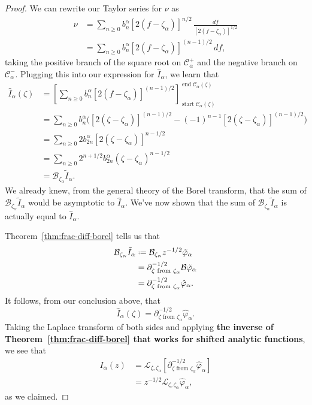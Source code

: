 \documentclass{article}
\newcommand*{\defeq}{\mathrel{\vcenter{\baselineskip0.5ex \lineskiplimit0pt
                     \hbox{\scriptsize.}\hbox{\scriptsize.}}}%
                     =}
\newcommand{\laplace}{\mathcal{L}}
\begin{document}
\begin{proof}
We can rewrite our Taylor series for $\nu$ as
\begin{align*}
\nu & = \sum_{n \ge 0} b_n^\alpha [2(f - \zeta_\alpha)]^{n/2}\,\frac{df}{[2(f - \zeta_\alpha)]^{1/2}} \\
& = \sum_{n \ge 0} b_n^\alpha [2(f - \zeta_\alpha)]^{(n - 1)/2}\,df,
\end{align*}
taking the positive branch of the square root on $\mathcal{C}^+_\alpha$ and the negative branch on $\mathcal{C}^-_\alpha$. Plugging this into our expression for $\hat{I}_\alpha$, we learn that
\begin{align*}
\hat{I}_\alpha(\zeta) & = \left[ \sum_{n \ge 0} b_n^\alpha [2(f - \zeta_\alpha)]^{(n - 1)/2} \right]_{\operatorname{start} \mathcal{C}_\alpha(\zeta)}^{\operatorname{end} \mathcal{C}_\alpha(\zeta)} \\
& = \sum_{n \ge 0} b_n^\alpha \Big( [2(\zeta - \zeta_\alpha)]^{(n - 1)/2} - (-1)^{n-1}[2(\zeta - \zeta_\alpha)]^{(n - 1)/2} \Big) \\
& = \sum_{n \ge 0} 2 b_{2n}^\alpha [2(\zeta - \zeta_\alpha)]^{n - 1/2} \\
& = \sum_{n \ge 0} 2^{n+1/2} b_{2n}^\alpha (\zeta - \zeta_\alpha)^{n - 1/2} \\
& = \mathcal{B}_{\zeta_\alpha} \tilde{I}_\alpha.
\end{align*}
We already knew, from the general theory of the Borel transform, that the sum of $\mathcal{B}_{\zeta_\alpha} \tilde{I}_\alpha$ would be asymptotic to $\hat{I}_\alpha$. We've now shown that the sum of $\mathcal{B}_{\zeta_\alpha} \tilde{I}_\alpha$ is actually equal to $\hat{I}_\alpha$.

Theorem~\ref{thm:frac-diff-borel} tells us that
\begin{align*}
\mathcal{B}_{\zeta_\alpha} \tilde{I}_\alpha & \defeq \mathcal{B}_{\zeta_\alpha} z^{-1/2} \tilde{\varphi}_\alpha \\
& = \partial^{-1/2}_{\zeta \text{ from } \zeta_\alpha} \mathcal{B} \tilde{\varphi}_\alpha \\
& = \partial^{-1/2}_{\zeta \text{ from } \zeta_\alpha} \hat{\varphi}_\alpha.
\end{align*}
It follows, from our conclusion above, that
\begin{equation}\label{shifted-resum-valid}
\hat{I}_\alpha(\zeta) = \partial^{-1/2}_{\zeta \text{ from } \zeta_\alpha} \hat{\varphi}_\alpha.
\end{equation}
Taking the Laplace transform of both sides and applying \textbf{the inverse of Theorem~\ref{thm:frac-diff-borel} that works for shifted analytic functions}, we see that
\begin{align*}
I_\alpha(z) & = \laplace_{\zeta, \zeta_\alpha} \left[ \partial^{-1/2}_{\zeta \text{ from } \zeta_\alpha} \hat{\varphi}_\alpha \right] \\
& = z^{-1/2} \laplace_{\zeta, \zeta_\alpha} \hat{\varphi}_\alpha,
\end{align*}
as we claimed.


\end{proof}
\end{document}
